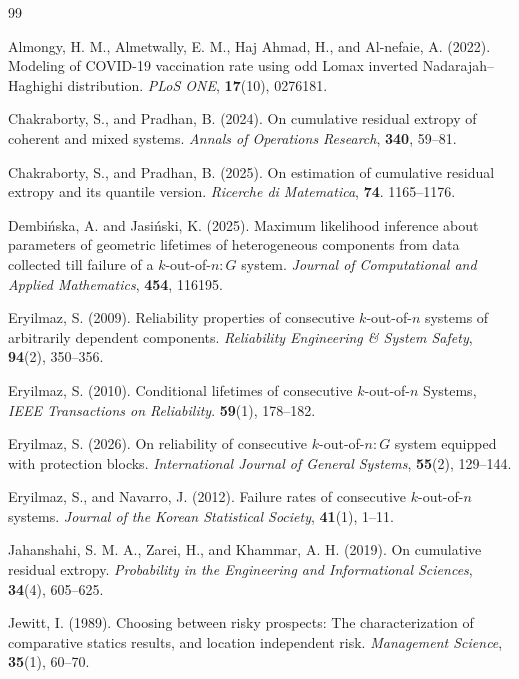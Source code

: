 \documentclass[12pt,a4paper]{article}
\numberwithin{equation}{section}
\begin{document}
\begin{thebibliography}{99}

Almongy, H. M., Almetwally, E. M., Haj Ahmad, H., and Al-nefaie, A. (2022). Modeling of COVID-19 vaccination rate using odd Lomax inverted Nadarajah--Haghighi distribution. \textit{PLoS ONE}, \textbf{17}(10), 0276181.

Chakraborty, S., and Pradhan, B. (2024). On cumulative residual extropy of coherent and mixed systems. \textit{Annals of Operations Research}, \textbf{340}, 59--81.

Chakraborty, S., and Pradhan, B. (2025). On estimation of cumulative residual extropy and its quantile version. \textit{Ricerche di Matematica}, \textbf{74}. 1165--1176.

Dembińska, A. and Jasiński, K. (2025). Maximum likelihood inference about parameters of geometric lifetimes of heterogeneous components from data collected till failure of a $k$-out-of-$n{:}G$ system. \textit{Journal of Computational and Applied Mathematics}, \textbf{454}, 116195.


Eryilmaz, S. (2009). Reliability properties of consecutive $k$-out-of-$n$ systems of arbitrarily dependent components. \textit{Reliability Engineering \& System Safety}, \textbf{94}(2), 350--356.

Eryilmaz, S. (2010). Conditional lifetimes of consecutive  $k$-out-of-$n$  Systems, \textit{IEEE Transactions on Reliability}. \textbf{59}(1), 178--182.

Eryilmaz, S. (2026). On reliability of consecutive $k$-out-of-$n:G$ system equipped with protection blocks. \textit{International Journal of General Systems}, \textbf{55}(2), 129--144.

Eryilmaz, S., and Navarro, J. (2012). Failure rates of consecutive $k$-out-of-$n$ systems. \textit{Journal of the Korean Statistical Society}, \textbf{41}(1), 1--11.

Jahanshahi, S. M. A., Zarei, H., and Khammar, A. H. (2019). On cumulative residual extropy. \textit{Probability in the Engineering and Informational Sciences}, \textbf{34}(4), 605--625.

Jewitt, I. (1989). Choosing between risky prospects: The characterization of comparative statics results, and location independent risk. \textit{Management Science}, \textbf{35}(1), 60--70.


\end{thebibliography}
\end{document}
